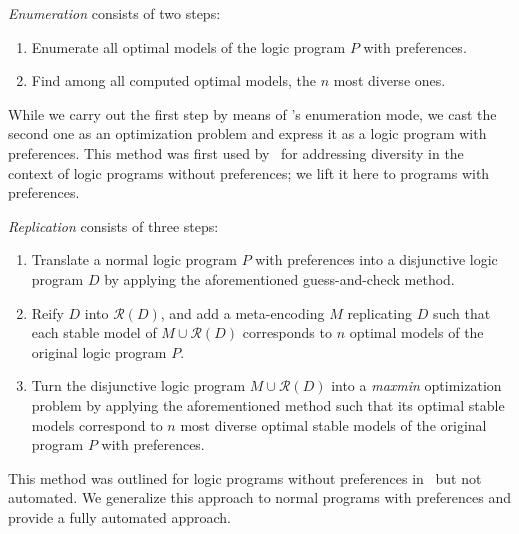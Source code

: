 \emph{Enumeration} consists of two steps:
\begin{enumerate}
\item Enumerate all optimal models of the logic program $P$ with preferences. 
\item Find among all computed optimal models, the $n$ most diverse ones.
\end{enumerate}
While we carry out the first step by means of \asprin's enumeration mode,
we cast the second one as an optimization problem and express it as a logic program with preferences.
%
This method was first used by~\cite{eiererfi13a} for addressing diversity in the context of logic programs without preferences;
we lift it here to programs with preferences.

\emph{Replication} consists of three steps:
\begin{enumerate}
\item Translate a normal logic program $P$ with preferences into a disjunctive logic program $D$
  by applying the aforementioned guess-and-check method.
\item Reify $D$ into $\mathcal{R}(D)$, and add a meta-encoding $M$ replicating $D$ 
  such that each stable model of $M \cup \mathcal{R}(D)$ 
  corresponds to $n$ optimal models of the original logic program $P$.
\item Turn the disjunctive logic program $M \cup \mathcal{R}(D)$ into a \emph{maxmin} optimization problem
  by applying the aforementioned method such that its optimal stable models
  correspond to $n$ most diverse optimal stable models of the original program $P$ with preferences.
\end{enumerate}
%
This method was outlined for logic programs without preferences in~\cite{eiererfi13a} but not automated.
We generalize this approach to normal programs with preferences and provide a fully automated approach.



